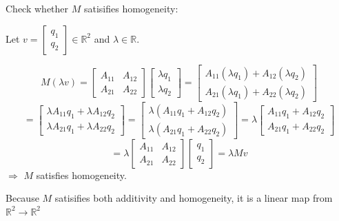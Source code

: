 \documentclass[fleqn]{article}
\begin{document}
\begin{enumerate}[nolistsep]
\begin{enumerate}[nolistsep]
					Check whether $M$ satisifies homogeneity:
					
					Let $v = \begin{bmatrix}q_1 \\ q_2\end{bmatrix} \in \mathbb{R}^2$ and $\lambda \in \mathbb{R}$.
					
					\begin{equation*}
						M({\lambda}v) = \begin{bmatrix} A_{11} & A_{12} \\ A_{21} & A_{22}\end{bmatrix}\begin{bmatrix} {\lambda}q_1 \\ {\lambda}q_2\end{bmatrix} = \begin{bmatrix} A_{11}({\lambda}q_1) + A_{12}({\lambda}q_2) \\ A_{21}({\lambda}q_1) + A_{22}({\lambda}q_2) \end{bmatrix}
					\end{equation*}
					\begin{equation*}
						= \begin{bmatrix} {\lambda}A_{11}q_1 + {\lambda}A_{12}q_2 \\ {\lambda}A_{21}q_1 + {\lambda}A_{22}q_2 \end{bmatrix} = \begin{bmatrix} \lambda(A_{11}q_1 + A_{12}q_2)\\ \lambda(A_{21}q_1 + A_{22}q_2)\end{bmatrix} = \lambda\begin{bmatrix}A_{11}q_1 + A_{12}q_2 \\ A_{21}q_1 + A_{22}q_2\end{bmatrix}
					\end{equation*}
					\begin{equation*}
						= \lambda\begin{bmatrix}A_{11} & A_{12}\\ A_{21} & A_{22}\end{bmatrix}\begin{bmatrix}q_1 \\ q_2\end{bmatrix} = {\lambda}Mv
					\end{equation*}
					$\Rightarrow$ $M$ satisfies homogeneity.
					
					Because $M$ satisifies both additivity and homogeneity, it is a linear map from $\mathbb{R}^2 \rightarrow \mathbb{R}^2$
					

\end{enumerate}
\end{enumerate}
\end{document}
